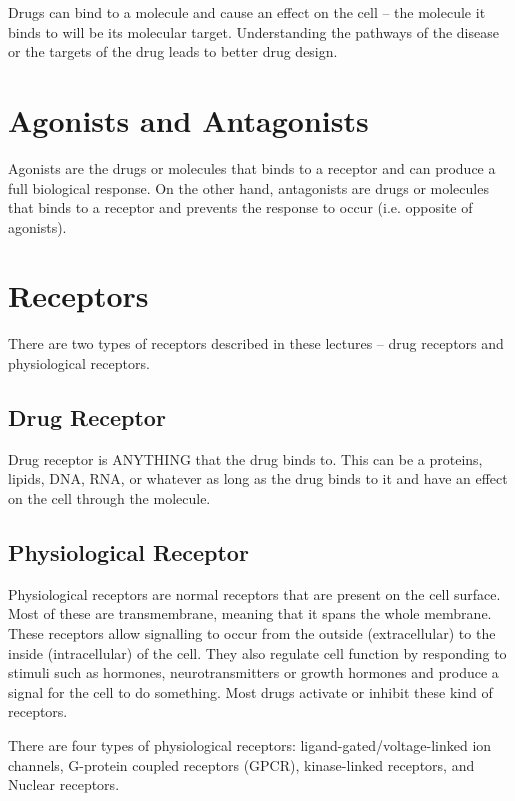 \documentclass[a4paper, 12pt]{report}
\begin{document}
Drugs can bind to a molecule and cause an effect on the cell -- the molecule it binds to will be its molecular target.
Understanding the pathways of the disease or the targets of the drug leads to better drug design.

\section{Agonists and Antagonists}

Agonists are the drugs or molecules that binds to a receptor and can produce a full biological response.
On the other hand, antagonists are drugs or molecules that binds to a receptor and prevents the response to occur (i.e. opposite of agonists).

\section{Receptors}

There are two types of receptors described in these lectures -- drug receptors and physiological receptors.

\subsection{Drug Receptor}

Drug receptor is ANYTHING that the drug binds to.
This can be a proteins, lipids, DNA, RNA, or whatever as long as the drug binds to it and have an effect on the cell through the molecule.

\subsection{Physiological Receptor}

Physiological receptors are normal receptors that are present on the cell surface.
Most of these are transmembrane, meaning that it spans the whole membrane.
These receptors allow signalling to occur from the outside (extracellular) to the inside (intracellular) of the cell.
They also regulate cell function by responding to stimuli such as hormones, neurotransmitters or growth hormones and produce a signal for the cell to do something.
Most drugs activate or inhibit these kind of receptors.

There are four types of physiological receptors: ligand-gated/voltage-linked ion channels, G-protein coupled receptors (GPCR), kinase-linked receptors, and Nuclear receptors.
\end{document}
